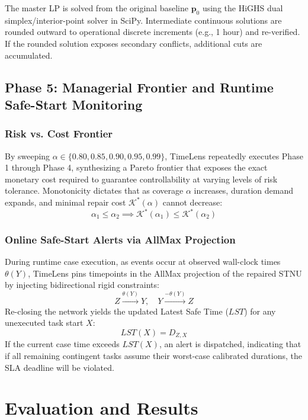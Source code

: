 \documentclass[conference]{IEEEtran}
\begin{document}
The master LP is solved from the original baseline $\mathbf{p}_0$ using the HiGHS dual simplex/interior-point solver in SciPy. Intermediate continuous solutions are rounded outward to operational discrete increments (e.g., 1 hour) and re-verified. If the rounded solution exposes secondary conflicts, additional cuts are accumulated.

\subsection{Phase 5: Managerial Frontier and Runtime Safe-Start Monitoring}

\subsubsection{Risk vs. Cost Frontier}
By sweeping $\alpha \in \{0.80, 0.85, 0.90, 0.95, 0.99\}$, TimeLens repeatedly executes Phase 1 through Phase 4, synthesizing a Pareto frontier that exposes the exact monetary cost required to guarantee controllability at varying levels of risk tolerance. Monotonicity dictates that as coverage $\alpha$ increases, duration demand expands, and minimal repair cost $\mathcal{K}^*(\alpha)$ cannot decrease:
\begin{equation}
\alpha_1 \leq \alpha_2 \implies \mathcal{K}^*(\alpha_1) \leq \mathcal{K}^*(\alpha_2)
\end{equation}

\subsubsection{Online Safe-Start Alerts via AllMax Projection}
During runtime case execution, as events occur at observed wall-clock times $\theta(Y)$, TimeLens pins timepoints in the AllMax projection of the repaired STNU by injecting bidirectional rigid constraints:
\begin{equation}
Z \xrightarrow{\theta(Y)} Y, \quad Y \xrightarrow{-\theta(Y)} Z
\end{equation}
Re-closing the network yields the updated Latest Safe Time ($LST$) for any unexecuted task start $X$:
\begin{equation}
LST(X) = D_{Z, X}
\end{equation}
If the current case time exceeds $LST(X)$, an alert is dispatched, indicating that if all remaining contingent tasks assume their worst-case calibrated durations, the SLA deadline will be violated.

\section{Evaluation and Results}
\label{sec:evaluation}
\end{document}
